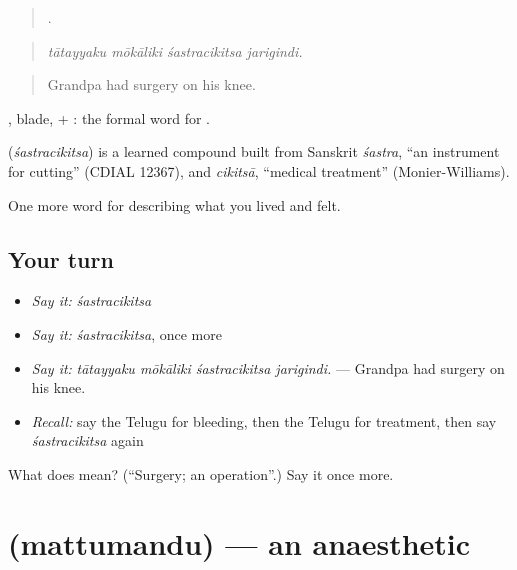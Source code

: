 \begin{quote}
   .
\end{quote}

\begin{quote}
\emph{tātayyaku mōkāliki śastracikitsa jarigindi.}
\end{quote}

\begin{quote}
Grandpa had surgery on his knee.
\end{quote}

, blade, + : the formal word for .

\begin{cousinweb}
\textbf{} (\emph{śastracikitsa}) is a learned compound built from Sanskrit \emph{śastra}, \textquotedblleft{}an instrument for cutting\textquotedblright{} (CDIAL 12367), and \emph{cikitsā}, \textquotedblleft{}medical treatment\textquotedblright{} (Monier-Williams).
\end{cousinweb}

\begin{grammarlens}[title={What you've built}]
One more word for describing what you lived and felt.
\end{grammarlens}

\subsection*{Your turn}
\begin{itemize}
\raggedright
  \item \emph{Say it:} \emph{śastracikitsa}
  \item \emph{Say it:} \emph{śastracikitsa}, once more
  \item \emph{Say it:} \emph{tātayyaku mōkāliki śastracikitsa jarigindi.} — Grandpa had surgery on his knee.
  \item \emph{Recall:} say the Telugu for bleeding, then the Telugu for treatment, then say \emph{śastracikitsa} again
\end{itemize}

\begin{tcolorbox}[breakable,colback=teal!4,colframe=teal!35!black,title={Before you move on}]
What does  mean? (\textquotedblleft{}Surgery; an operation\textquotedblright{}.) Say it once more.
\end{tcolorbox}
\section[\texorpdfstring{\te{మత్తుమందు} (mattumandu)}{మత్తుమందు (mattumandu)}]{ (mattumandu) — an anaesthetic}

